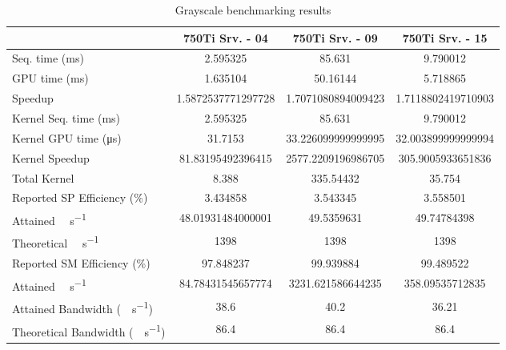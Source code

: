 \begin{table}[H]
	\centering
	\caption{Grayscale benchmarking results}
	\label{tab:grayscale-results}
	\begin{tabular}{lS[table-format=7.1]S[table-format=7.1]S[table-format=7.1]}
		\toprule
			~ & {\textbf{750Ti Srv. - 04}} & {\textbf{750Ti Srv. - 09}} & {\textbf{750Ti Srv. - 15}} \\
		\midrule
			{Seq. time (\si{\milli\second})} & 2.595325 & 85.631 & 9.790012 \\
			{GPU time (\si{\milli\second})} & 1.635104 & 50.16144 & 5.718865 \\
			{Speedup} & 1.5872537771297728 &1.7071080894009423 & 1.7118802419710903 \\
		\midrule
			{Kernel Seq. time (\si{\milli\second})} & 2.595325 & 85.631 & 9.790012 \\
			{Kernel GPU time (\si{\micro\second})} & 31.7153 & 33.226099999999995 & 32.003899999999994 \\
			{Kernel Speedup} & 81.83195492396415 & 2577.2209196986705 & 305.9005933651836 \\
		\midrule
			{Total Kernel \si{\mega\flops}} & 8.388 & 335.54432 & 35.754 \\
			{Reported SP Efficiency (\si{\percent})} & 3.434858 & 3.543345 & 3.558501 \\
			{Attained \si{\giga\flops\per\second}} & 48.01931484000001 & 49.5359631 & 49.74784398 \\
			{Theoretical \si{\giga\flops\per\second}} & 1398 & 1398 & 1398 \\
		\midrule
			{Reported SM Efficiency (\si{\percent})} & 97.848237 & 99.939884 & 99.489522 \\
			{Attained \si{\giga\iops\per\second}} & 84.78431545657774 & 3231.621586644235 & 358.09535712835 \\			
		\midrule
			{Attained Bandwidth (\si{\giga\byte\per\second})} & 38.6 & 40.2  & 36.21 \\
			{Theoretical Bandwidth (\si{\giga\byte\per\second})}	& 86.4 & 86.4 & 86.4 \\
		\bottomrule
	\end{tabular}
\end{table}